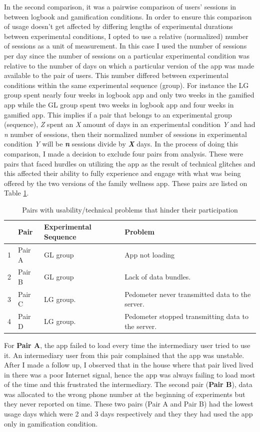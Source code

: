 In the second comparison, it was a pairwise comparison of users' sessions in between logbook and gamification conditions. In order to ensure this comparison of usage doesn't get affected by differing lengths of experimental durations between experimental conditions, I opted to use a relative (normalized) number of sessions  as a unit of measurement. In this case I used the number of sessions per day since the number of sessions on a particular experimental condition was relative to the number of days on which a particular version of the app was made available to the pair of users. This number differed between experimental conditions within the same experimental sequence (group). For instance the LG group spent nearly four weeks in logbook app and only two weeks in the gamified app while the GL group spent two weeks in logbook app and four weeks in gamified app. This implies if a pair that belongs to an experimental group (sequence), \emph{Z} spent an \emph{X} amount of days in an experimental condition \emph{Y} and had \emph{n} number of sessions, then their normalized number of sessions in experimental condition \emph{Y} will be \emph{\textbf{n}} sessions divide by \emph{\textbf{X}} days. In the process of doing this comparison, I made a decision to exclude four pairs from analysis. These were pairs that faced hurdles on utilizing the app as the result of technical glitches and this affected their ability to fully experience and engage with what was being offered by the two versions of the family wellness app. These pairs are listed on Table \ref{table:usageproblems}.
\begin{table}[h!]
  \begin{center}
    \caption{Pairs with usability/technical problems that hinder their participation}
    \label{table:usageproblems}
	\begin{tabular}{|l|l|l|p{6cm}|}
		\hline
		&Pair&Experimental Sequence&Problem\\
		\hline
		1&Pair A&GL group &App not loading\\
		\hline
		2&Pair B&GL group&Lack of data bundles. \\
		\hline
		3&Pair C & LG group.& Pedometer never transmitted data to the server.\\
		\hline
		4&Pair D & LG group.& Pedometer stopped transmitting data to the server.\\
	\hline
	\end{tabular}
  \end{center}
\end{table}
For \textbf{Pair A}, the app failed to load every time the intermediary user tried to use it. An intermediary user from this pair complained that the app was unstable. After I made a follow up, I observed that in the house where that pair lived lived in there was a poor Internet signal, hence the app was always failing to load most of the time and this frustrated the intermediary. The second pair (\textbf{Pair B}), data was allocated to the wrong phone number at the beginning of experiments but they never reported on time. These two pairs (Pair A and Pair B) had the lowest usage days which were 2 and 3 days respectively and they they had used the app only in gamification condition.

